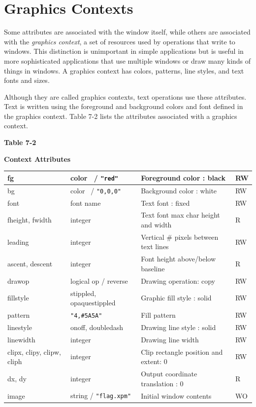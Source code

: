 \section{Graphics Contexts}

Some attributes are associated with the window itself, while others
are associated with the \textit{graphics context}, a set of resources
used by operations that write to windows. This distinction is
unimportant in simple applications but is useful in more sophisticated
applications that use multiple windows or draw many kinds of things in
windows. A graphics context has colors, patterns, line styles, and
text fonts and sizes.

Although they are called graphics contexts, text operations use these
attributes. Text is written using the foreground and background colors
and font defined in the graphics context. Table 7-2 lists the
attributes associated with a graphics context.

{\centering\sffamily\bfseries
Table 7-2
\par}

{\centering\sffamily\bfseries
Context Attributes
\par}

\begin{center}
\begin{supertabular}{|m{1.076in}|m{1.5in}|m{2.58in}|m{0.448in}|}
fg &
color \ / \texttt{"red"} &
Foreground color : black &
RW\\\hline
bg &
color \ / \texttt{"0,0,0"} &
Background color : white &
RW\\\hline
font &
font name &
Text font : fixed &
RW\\\hline
fheight, fwidth &
integer &
Text font max char height and width &
R\\\hline
leading &
integer &
Vertical \# pixels between text lines &
RW\\\hline
ascent, descent &
integer &
Font height above/below baseline &
R\\\hline
drawop &
logical op / reverse  &
Drawing operation: copy &
RW\\\hline
fillstyle &
stippled, opaquestippled &
Graphic fill style : solid &
RW\\\hline
pattern &
\texttt{"4,\#5A5A"} &
Fill pattern &
RW\\\hline
linestyle &
onoff, doubledash &
Drawing line style : solid  &
RW\\\hline
linewidth &
integer &
Drawing line width &
RW\\\hline
clipx, clipy, clipw, cliph &
integer &
Clip rectangle position and extent: 0 &
RW\\\hline
dx, dy &
integer &
Output coordinate translation : 0 &
R\\\hline
image &
string / \texttt{"flag.xpm"} &
Initial window contents &
WO\\\hline
\end{supertabular}
\end{center}

